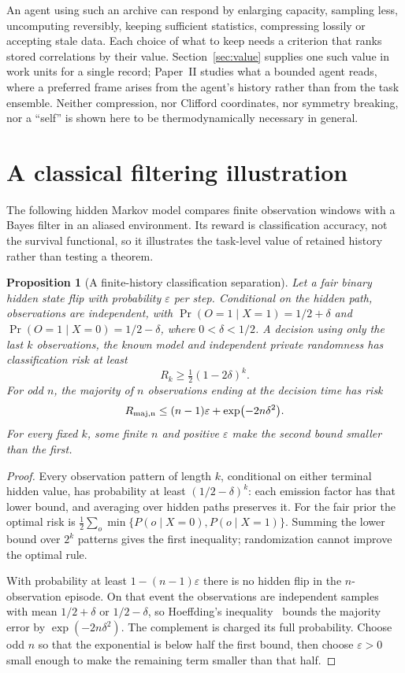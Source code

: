 \documentclass[12pt]{article}
\newtheorem{proposition}[theorem]{Proposition}
\begin{document}
An agent using such an archive can respond by enlarging capacity, sampling less, uncomputing reversibly, keeping sufficient statistics, compressing lossily or accepting stale data. Each choice of what to keep needs a criterion that ranks stored correlations by their value. Section~\ref{sec:value} supplies one such value in work units for a single record; Paper~II studies what a bounded agent reads, where a preferred frame arises from the agent's history rather than from the task ensemble. Neither compression, nor Clifford coordinates, nor symmetry breaking, nor a ``self'' is shown here to be thermodynamically necessary in general.

\section{A classical filtering illustration}
\label{sec:numerical}

The following hidden Markov model compares finite observation windows with a Bayes filter in an aliased environment. Its reward is classification accuracy, not the survival functional, so it illustrates the task-level value of retained history rather than testing a theorem.

\begin{proposition}[A finite-history classification separation]
\label{prop:history_separation}
Let a fair binary hidden state flip with probability $\varepsilon$ per step. Conditional on the hidden path, observations are independent, with
$\Pr(O=1\mid X=1)=1/2+\delta$ and
$\Pr(O=1\mid X=0)=1/2-\delta$, where $0<\delta<1/2$.
A decision using only the last $k$ observations, the known model and independent private randomness has classification risk at least
\[
 R_k\ge \tfrac12(1-2\delta)^k.
\]
For odd $n$, the majority of $n$ observations ending at the decision time has risk
\[
 R_{\rm maj,n}\le(n-1)\varepsilon+\exp(-2n\delta^2).
\]
For every fixed $k$, some finite $n$ and positive $\varepsilon$ make the second bound smaller than the first.
\end{proposition}

\begin{proof}
Every observation pattern of length $k$, conditional on either terminal hidden value, has probability at least $(1/2-\delta)^k$: each emission factor has that lower bound, and averaging over hidden paths preserves it. For the fair prior the optimal risk is
$\frac12\sum_o\min\{P(o\mid X=0),P(o\mid X=1)\}$.
Summing the lower bound over $2^k$ patterns gives the first inequality; randomization cannot improve the optimal rule.

With probability at least $1-(n-1)\varepsilon$ there is no hidden flip in the $n$-observation episode. On that event the observations are independent samples with mean $1/2+\delta$ or $1/2-\delta$, so Hoeffding's inequality~\cite{Hoeffding1963} bounds the majority error by $\exp(-2n\delta^2)$. The complement is charged its full probability. Choose odd $n$ so that the exponential is below half the first bound, then choose $\varepsilon>0$ small enough to make the remaining term smaller than that half.
\end{proof}
\end{document}
